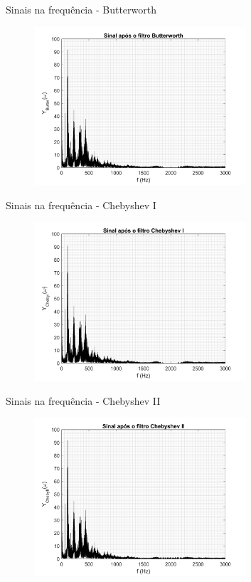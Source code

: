 \begin{frame}{Sinais na frequência - Butterworth}
    \begin{figure}
        \centering
        \includegraphics[width=0.7\textwidth]{graficos/filtrados_f_b.png}
    \end{figure}
\end{frame}
\begin{frame}{Sinais na frequência - Chebyshev I}
    \begin{figure}
        \centering
        \includegraphics[width=0.7\textwidth]{graficos/filtrados_f_c1.png}
    \end{figure}
\end{frame}
\begin{frame}{Sinais na frequência - Chebyshev II}
    \begin{figure}
        \centering
        \includegraphics[width=0.7\textwidth]{graficos/filtrados_f_c2.png}
    \end{figure}
\end{frame}
